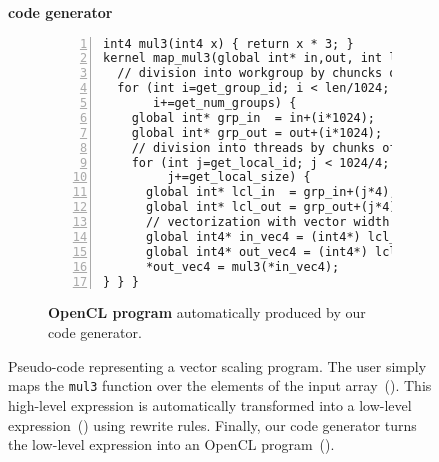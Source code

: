 \begin{figure}[t]
\vspace{-5pt}
\begin{minipage}{0.1\linewidth}
\vspace{0pt}
\centering
{}
\end{minipage}
\begin{minipage}{0.26\linewidth}
\vspace{-5pt}
\centering
\textbf{code generator}
\end{minipage}
\begin{minipage}{0.1\linewidth}
\vspace{0pt}
\centering
{}
\end{minipage}

\begin{subfigure}[b]{\linewidth}
\centering
\begin{minipage}{.85\textwidth}
\begin{lstlisting}[mathescape,numbers=left]
int4 mul3(int4 x) { return x * 3; }
kernel map_mul3(global int* in,out, int len) {
  // division into workgroup by chuncks of 1024
  for (int i=get_group_id; i < len/1024;
       i+=get_num_groups) {
    global int* grp_in  = in+(i*1024);
    global int* grp_out = out+(i*1024);
    // division into threads by chunks of 4
    for (int j=get_local_id; j < 1024/4;
         j+=get_local_size) {
      global int* lcl_in  = grp_in+(j*4);
      global int* lcl_out = grp_out+(j*4);
      // vectorization with vector width of 4
      global int4* in_vec4 = (int4*) lcl_in;
      global int4* out_vec4 = (int4*) lcl_out;
      *out_vec4 = mul3(*in_vec4);      
} } }  
\end{lstlisting}
\end{minipage}
\caption{\textbf{OpenCL program} automatically produced by our code generator.}
\label{fig:codeex:ocl}
\end{subfigure}

\caption{Pseudo-code representing a vector scaling program.
The user simply maps the \texttt{mul3} function over the elements of the input array~().
This high-level expression is automatically transformed into a low-level expression~() using rewrite rules.
Finally, our code generator turns the low-level expression into an OpenCL program~().}
\label{fig:codeex}
\end{figure}

